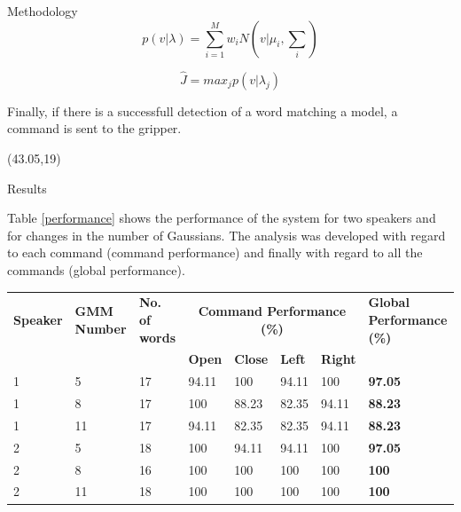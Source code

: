 \documentclass[final]{beamer}
\begin{document}
\begin{frame}{}
\begin{textblock}{39.5}
\begin{block}{Methodology}
\begin{equation}
   p(v \lvert \lambda)=\sum_{i=1}^{M}w_iN(v \lvert \mu_i,\sum_i) \label{prob}
\end{equation}

\begin{equation}
   \hat{J}= max_{j} p(v \lvert \lambda_j) \label{prob2}
\end{equation}

\vspace{1ex}

Finally, if there is a successfull detection of a word matching a model, a command is sent to the gripper.

\end{block}
\end{textblock}

\begin{textblock}{39.5}(43.05,19)

\begin{block}{Results}

Table \ref{performance} shows the performance of the system for two speakers and for changes in the number of Gaussians. The analysis was developed with regard to each command (command performance) and finally with regard to all the commands (global performance).

\begin{table}[h]
\centering
\footnotesize
\begin{tabular}{||p{3.5cm}||p{4cm}||p{3cm}||p{4cm}||p{4cm}||p{4cm}||p{4cm}||p{6cm}||}%
\hline 
\textbf{Speaker} &  \textbf{GMM Number} & \textbf{No. of words} & \multicolumn{4}{|c||}{\textbf{Command Performance (\%)}} & \textbf{Global Performance (\%)}\\
\cline{4-7}
& & & \textbf{Open} & \textbf{Close} & \textbf{Left} & \textbf{Right} & \\
\hline \hline

1 &5 &17 &94.11 &100 &94.11 &100 & \textbf{97.05} \\
\hline 
1 &8 &17 &100 &88.23 &82.35 &94.11 &\textbf{88.23} \\
\hline
1 &11 &17 &94.11 &82.35 &82.35 &94.11 &\textbf{88.23} \\
\hline
2 &5 &18 &100 &94.11 &94.11 &100 & \textbf{97.05}\\
\hline
2 &8 &16 &100 &100 &100 &100 & \textbf{100}\\
\hline
2 &11 &18 &100 &100 &100 &100 & \textbf{100}\\
\hline


\end{tabular}
\end{table}
\end{block}
\end{textblock}
\end{frame}
\end{document}

